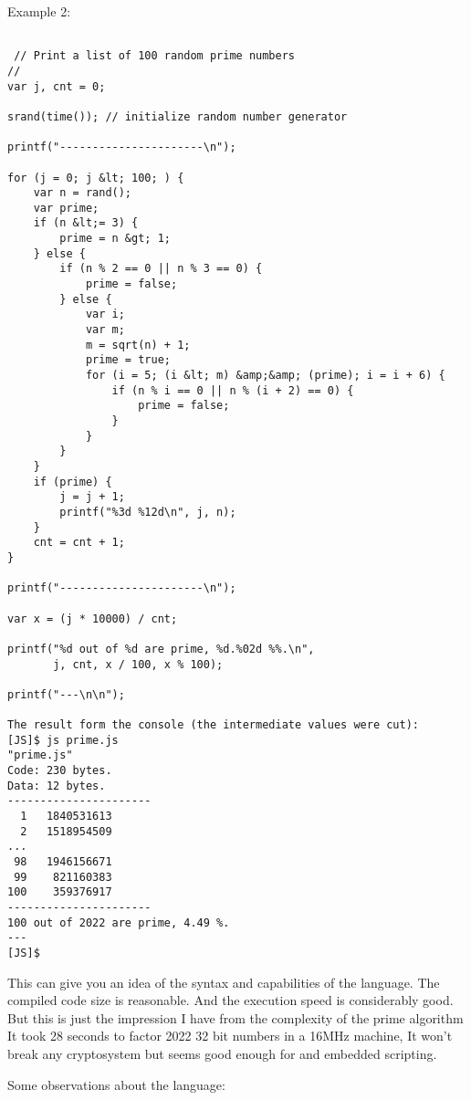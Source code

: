 \documentclass[11pt]{article} %
\begin{document}
Example 2:
\begin{lstlisting}[caption={Example 2},label={lst:verilog-if},language=C99,frame=single]

 // Print a list of 100 random prime numbers
//
var j, cnt = 0;

srand(time()); // initialize random number generator

printf("----------------------\n");

for (j = 0; j &lt; 100; ) {
    var n = rand();
    var prime;
    if (n &lt;= 3) {
        prime = n &gt; 1;
    } else {
        if (n % 2 == 0 || n % 3 == 0) {
            prime = false;
        } else {
            var i;
            var m;
            m = sqrt(n) + 1;
            prime = true;
            for (i = 5; (i &lt; m) &amp;&amp; (prime); i = i + 6) {
                if (n % i == 0 || n % (i + 2) == 0) {
                    prime = false;
                }
            }
        }
    }
    if (prime) {
        j = j + 1;
        printf("%3d %12d\n", j, n);
    }
    cnt = cnt + 1;
}

printf("----------------------\n");

var x = (j * 10000) / cnt;

printf("%d out of %d are prime, %d.%02d %%.\n",
       j, cnt, x / 100, x % 100);

printf("---\n\n");

The result form the console (the intermediate values were cut):
[JS]$ js prime.js
"prime.js"
Code: 230 bytes.
Data: 12 bytes.
----------------------
  1   1840531613
  2   1518954509
...
 98   1946156671
 99    821160383
100    359376917
----------------------
100 out of 2022 are prime, 4.49 %.
---
[JS]$
\end{lstlisting}

This can give you an idea of the syntax and capabilities of the language.
The compiled code size is reasonable. And the execution speed is considerably good. But this is just the impression I have from the complexity of the prime algorithm It took 28 seconds to factor 2022 32 bit numbers in a 16MHz machine, It won't break any cryptosystem but seems good enough for and embedded scripting.

Some observations about the language:
\end{document}
